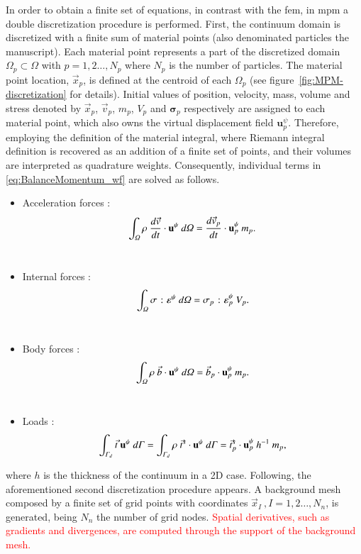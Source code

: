 \documentclass[preprint,12pt,a4paper]{elsarticle}
\newcommand{\vect}[1]{
  \ensuremath{\mathbf{{#1}}}
}
\newcommand{\tens}[1]{
  \ensuremath{\mathbf{{#1}}}
}
\newcommand{\Integral}[2]{
  \IfStrEqCase{#1}{
    {2}{\ensuremath{\int_{\varGamma_d}{#2}\ d\varGamma}}
    {3}{\ensuremath{\int_{\varOmega}{#2}\ d\varOmega}}
  }
}
\newcommand{\PNA}[1]{
  \textcolor{red}{{#1}}
}
\begin{document}
In order to obtain a finite set of equations, in contrast with the
\acrshort{fem}, in \acrshort{mpm} a double discretization procedure is
performed. First, the continuum \gls{domain} is discretized with a finite sum of material points (also denominated particles the manuscript). Each material point
represents a part of the discretized domain $\varOmega_p \subset
\varOmega$ with $p = 1,2\ldots ,N_p$ where $N_p$ is the number of
particles. The material point location, $\vec{x}_p$, is defined at the centroid
of each $\Omega_p$ (see figure~\ref{fig:MPM-discretization} for details).
Initial values of position,
velocity, mass, volume and stress denoted by $\vec{x}_p$,
$\vec{v}_p$, $m_p$,  $V_p$ and $\tens{\sigma}_p$ respectively are assigned to each material point, which also owns the
virtual displacement field $\vect{u}^{\psi}_{p}$. Therefore, employing
the definition of the material integral, where Riemann
integral definition \cite{Riemann_1854} is recovered as an addition of
a finite set of points, and their volumes are interpreted as quadrature weights. Consequently,
individual terms in \eqref{eq:BalanceMomentum_wf} are solved as follows. 
\begin{itemize}
\item Acceleration forces :
\begin{equation}
    \label{eq:particle_acceleration_forces}
    \Integral{3}{\rho\ \frac{d\vec{v}}{dt} \cdot \vect{u}^{\psi}} =
    \frac{d\vec{v}_{p}}{dt} \cdot \vect{u}^{\psi}_{p}\ m_p.
  \end{equation}\\
\item Internal forces :
  \begin{equation}
    \label{eq:particle_internal_forces}
    \Integral{3}{\tens{\sigma}\ \colon \tens{\varepsilon}^{\psi}} =
   \tens{\sigma}_{p}\ \colon \tens{\varepsilon}^{\psi}_p \ V_p.
  \end{equation}\\
\item Body forces :
\begin{equation}
  \label{eq:particle_body_forces}
  \Integral{3}{\rho\ \vec{b} \cdot \vect{u}^{\psi} } = 
  \vec{b}_{p} \cdot \vect{u}^{\psi}_p\ m_p.
\end{equation}\\
\item Loads :
\begin{equation}
  \begin{aligned}
    \label{eq:particle_load_forces}
    \Integral{2}{\vec{t}\ \vect{u}^{\psi}} = \Integral{2}{\rho\
      \vec{t}^s \cdot \vect{u}^{\psi}} = \vec{t}^s_{p} \cdot \vect{u}^{\psi}_{p}\ h^{-1}\ m_p ,
  \end{aligned} 
\end{equation}
\end{itemize}
where $h$ is the thickness of the continuum in a 2D case. Following, the aforementioned second discretization procedure appears. A background mesh
composed by a finite set of grid points with coordinates $\vec{x}_I\
, I = 1,2\ldots ,N_n$, is generated, being $N_n$ the number of grid
nodes.\PNA{Spatial derivatives, such as gradients and
divergences, are computed through the support of the background mesh.}
\end{document}

